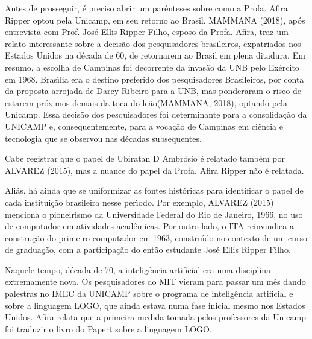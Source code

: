 \documentclass[
12pt,		%
openright,	%
twoside,  %
a4paper,			%
chapter=TITLE,		%
english,			%
french,				%
spanish,			%
brazil				%
]{USPSC-classe/USPSC}
\begin{document}
Antes de prosseguir, \'e preciso abrir um par\^enteses sobre como a Profa. Afira Ripper optou pela Unicamp, em seu retorno ao Brasil.  MAMMANA (2018), ap\'os entrevista com Prof. Jos\'e Ellis Ripper Filho, esposo da Profa. Afira, traz um relato interessante sobre a decis\~ao dos pesquisadores brasileiros, expatriados nos Estados Unidos na d\'ecada de 60, de retornarem ao Brasil em plena ditadura. Em resumo, a escolha de Campinas foi decorrente da invas\~ao da UNB pelo Ex\'ercito em 1968. Bras\'{\i}lia era o destino preferido dos pesquisadores Brasileiros, por conta da proposta arrojada de Darcy Ribeiro para a UNB, mas ponderaram o risco de estarem pr\'oximos demais da \textquotedbl toca do le\~ao\textquotedbl   (MAMMANA, 2018), optando pela Unicamp. Essa decis\~ao dos pesquisadores foi determinante para a consolida\c{c}\~ao da UNICAMP e, consequentemente, para a voca\c{c}\~ao de Campinas em ci\^encia e tecnologia que se observou nas d\'ecadas subsequentes.








Cabe registrar que o papel de Ubiratan D Ambr\'osio \'e relatado tamb\'em por ALVAREZ (2015), mas a nuance do papel da Profa. Afira Ripper n\~ao \'e relatada.








Ali\'as, h\'a ainda que se uniformizar as fontes hist\'oricas para identificar o papel de cada institui\c{c}\~ao brasileira nesse per\'{\i}odo. Por exemplo,  ALVAREZ (2015) menciona o pioneirismo da Universidade Federal do Rio de Janeiro, 1966, no uso de computador em atividades acad\^emicas. Por outro lado, o ITA reinvindica a constru\c{c}\~ao do primeiro computador em 1963, constru\'{\i}do no contexto de um curso de gradua\c{c}\~ao, com a participa\c{c}\~ao do ent\~ao estudante Jos\'e Ellis Ripper Filho.








Naquele tempo, d\'ecada de 70, a intelig\^encia artificial era uma disciplina extremamente nova. Os pesquisadores do MIT vieram para passar um m\^es dando palestras no IMEC da UNICAMP sobre o programa de intelig\^encia artificial e sobre a linguagem LOGO, que ainda estava numa fase inicial mesmo nos Estados Unidos. Afira relata que a primeira medida tomada pelos professores da Unicamp foi traduzir o livro do Papert sobre a linguagem LOGO.
\end{document}
